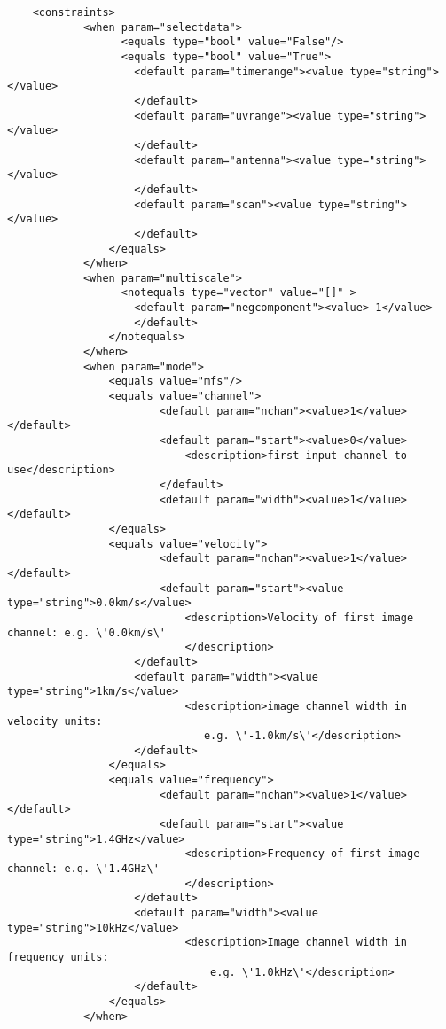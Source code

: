 \begin{verbatim}
    <constraints>
            <when param="selectdata">
                  <equals type="bool" value="False"/>
                  <equals type="bool" value="True">
                    <default param="timerange"><value type="string"></value>
                    </default>
                    <default param="uvrange"><value type="string"></value>
                    </default>
                    <default param="antenna"><value type="string"></value>
                    </default>
                    <default param="scan"><value type="string"></value>
                    </default>
                </equals>
            </when>
            <when param="multiscale">
                  <notequals type="vector" value="[]" > 
                    <default param="negcomponent"><value>-1</value>
                    </default>
                </notequals>
            </when>
            <when param="mode">
                <equals value="mfs"/>
                <equals value="channel">
                        <default param="nchan"><value>1</value></default>
                        <default param="start"><value>0</value>
                            <description>first input channel to use</description>
                        </default>
                        <default param="width"><value>1</value></default>
                </equals>
                <equals value="velocity">
                        <default param="nchan"><value>1</value></default>
                        <default param="start"><value type="string">0.0km/s</value>
                            <description>Velocity of first image channel: e.g. \'0.0km/s\'
                            </description>
                    </default>
                    <default param="width"><value type="string">1km/s</value>
                            <description>image channel width in velocity units: 
                               e.g. \'-1.0km/s\'</description>
                    </default>
                </equals>
                <equals value="frequency">
                        <default param="nchan"><value>1</value></default>
                        <default param="start"><value type="string">1.4GHz</value>
                            <description>Frequency of first image channel: e.q. \'1.4GHz\'
                            </description>
                    </default>
                    <default param="width"><value type="string">10kHz</value>
                            <description>Image channel width in frequency units:
                                e.g. \'1.0kHz\'</description>
                    </default>
                </equals>
            </when>
            

\end{verbatim}
